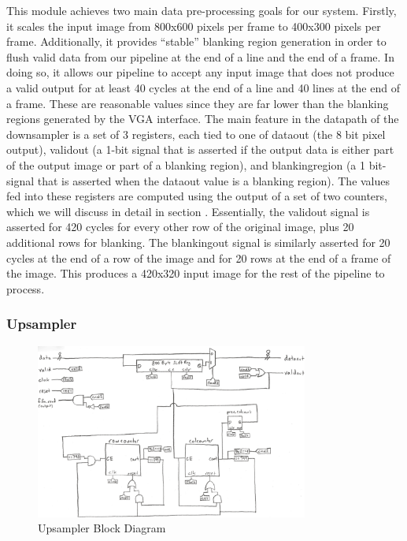 This module achieves two main data pre-processing goals for our system. Firstly,
it scales the input image from 800x600 pixels per frame to 400x300 pixels per frame.
Additionally, it provides ``stable'' blanking region generation in order to 
flush valid data from our pipeline at the end of a line and the end of a frame.
In doing so, it allows our pipeline to accept any input image that does not 
produce a valid output for at least 40 cycles at the end of a line and 40 lines
at the end of a frame. These are reasonable values since they are far lower than
the blanking regions generated by the VGA interface. The main feature in the
datapath of the downsampler is a set of 3 registers, each tied to one of 
dataout (the 8 bit pixel output), validout (a 1-bit signal that is asserted if
the output data is either part of the output image or part of a blanking region), 
and blankingregion (a 1 bit-signal that is asserted when the dataout value is
a blanking region). The values fed into these registers are computed using 
the output of a set of two counters, which we will discuss in detail in section 
. Essentially, the validout signal is asserted for 420 cycles for every other row 
of the original image, plus 20 additional rows for blanking. The blankingout signal
is similarly asserted for 20 cycles at the end of a row of the image and for
20 rows at the end of a frame of the image. This produces a 420x320 input image
for the rest of the pipeline to process.

\subsubsection{Upsampler}

\begin{figure}
    \centering
    \includegraphics[width=0.8\textwidth]{processed_image_pngs/Upsampler.png}
    \caption{Upsampler Block Diagram}
    \label{fig:upsampler}
\end{figure}


